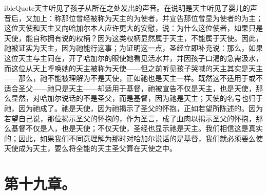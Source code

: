 ibleQuote{天主听见了孩子从所在之处发出的声音。}在说明是天主听见了婴儿的声音后，又加上：称那位曾经被称为天主的为使者，并宣告那位曾显为使者的为主；这位天使和天主又向哈加尔本人应许更大的安慰，说：为什么这位使者，如果只是天使，能自称拥有说的权柄？因为这类权柄显然属于天主，不能属于天使。因此，祂被证实为天主，因为祂能行这事；为证明这一点，圣经立即补充说：那么，如果这位天主与主同在，开了哈加尔的眼使她看见活水井，并因孩子口渴的急需汲水，而这位从天上呼唤她的天主被称为天使——但之前听见孩子哭喊的天主其实是天主——那么，祂不能被理解为不是天使，正如祂也是天主一样。既然这不适用于或不适合圣父——祂只是天主——却适用于基督，祂被宣告不仅是天主，也是天使，那么显然，对哈加尔说话的不是圣父，而是基督，因为祂是天主；天使的名号也归于祂，因为祂成了。祂是天使，因为祂揭示了圣父的怀抱，正如若望所陈述的。因为若望自己说，那位揭示圣父的怀抱的，作为圣言，成了血肉以揭示圣父的怀抱，那么基督不仅是人，也是天使；不仅天使，圣经也显示祂是天主。我们相信这是真实的；因此，如果我们不同意理解为那时对哈加尔说话的是基督，我们就必须要么使天使成为天主，要么将全能的天主圣父算在天使之中。\par


\section{第十九章。}

\par

